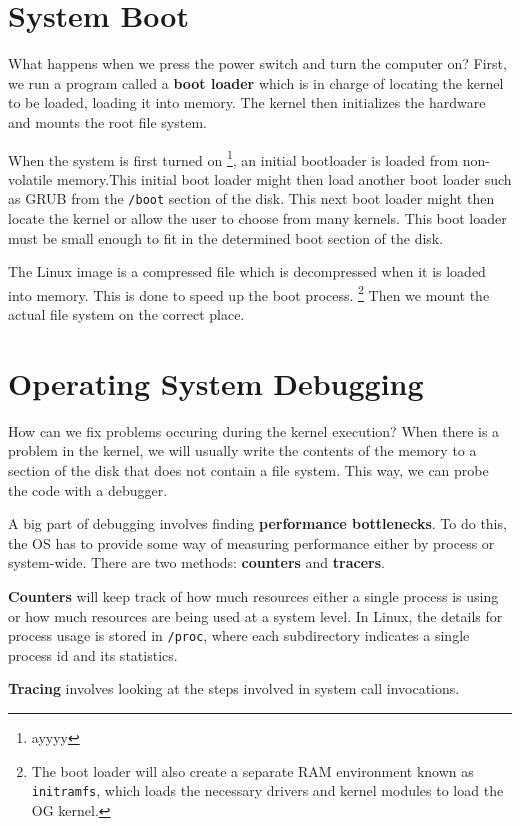 \documentclass{tufte-handout}
\begin{document}
\section{System Boot}
What happens when we press the power switch and turn the computer on? First, we 
run a program called a \textbf{boot loader} which is in charge of locating the 
kernel to be loaded, loading it into memory. The kernel then initializes the hardware
and mounts the root file system.

When the system is first turned on \footnote{ayyyy}, an initial bootloader is loaded
from non-volatile memory.This initial boot loader might then load another boot loader
such as GRUB from the \texttt{/boot} section of the disk. This next boot loader might
then locate the kernel or allow the user to choose from many kernels. This boot 
loader must be small enough to fit in the determined boot section of the disk.

The Linux image is a compressed file which is decompressed when it is loaded into
memory. This is done to speed up the boot process.
\footnote{The boot loader will also create a separate RAM environment known as 
\texttt{initramfs}, which loads the necessary drivers and kernel modules to load the
OG kernel.}
Then we mount the actual file system on the correct place.

\section{Operating System Debugging}
How can we fix problems occuring during the kernel execution? When there is a problem
in the kernel, we will usually write the contents of the memory to a section of the 
disk that does not contain a file system. This way, we can probe the code with a 
debugger.

A big part of debugging involves finding \textbf{performance bottlenecks}. To do this,
the OS has to provide some way of measuring performance either by process or 
system-wide. There are two methods: \textbf{counters} and \textbf{tracers}.

\textbf{Counters} will keep track of how much resources either a single process 
is using or how much resources are being used at a system level. In Linux, the details
for process usage is stored in \texttt{/proc}, where each subdirectory indicates a 
single process id and its statistics.

\textbf{Tracing} involves looking at the steps involved in system call invocations.
\end{document}
